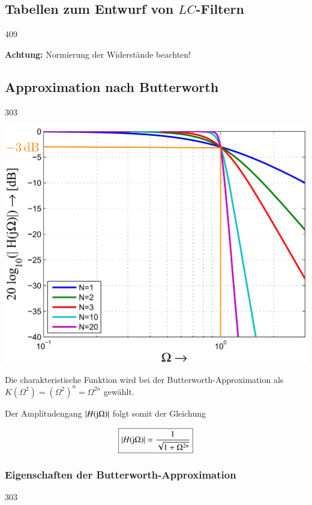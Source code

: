 \subsection[Tabellen zum Entwurf von LC-Filtern]{Tabellen zum Entwurf von $LC$-Filtern}{409}
\label{Tabellen}

\textbf{Achtung:} Normierung der Widerstände beachten!


\subsection{Approximation nach Butterworth}{303}

\begin{minipage}[c]{0.45\columnwidth}
    \includegraphics[width=\columnwidth]{images/filter_butterworth_amplitudengang.png}
\end{minipage}
\hfill
\begin{minipage}[c]{0.48\columnwidth}
    Die charakteristische Funktion wird bei der Butterworth-Approximation als\\
    $K(\Omega^2) = (\Omega^2)^n = \Omega^{2n}$ gewählt.

    Der Amplitudengang $|H(\mathrm{j} \Omega)|$ folgt somit der Gleichung

    $$\boxed{ |H(\mathrm{j} \Omega)| = \frac{1}{\sqrt{ 1 +\Omega^{2n}}} } $$
\end{minipage}


\subsubsection{Eigenschaften der Butterworth-Approximation}{303}

